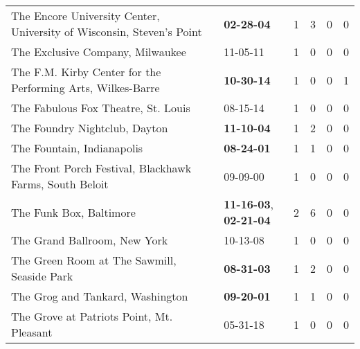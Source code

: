 \begin{longtable}{p{}p{}p{}p{}p{}p{}}
        The Encore University Center, University of Wisconsin, Steven’s Point &                                       \textbf{02-28-04\textsuperscript{}} &  1 &  3 &  0 &  0 \\
                                             The Exclusive Company, Milwaukee &                                                11-05-11\textsuperscript{} &  1 &  0 &  0 &  0 \\
                  The F.M. Kirby Center for the Performing Arts, Wilkes-Barre &                                       \textbf{10-30-14\textsuperscript{}} &  1 &  0 &  0 &  1 \\
                                          The Fabulous Fox Theatre, St. Louis &                                                08-15-14\textsuperscript{} &  1 &  0 &  0 &  0 \\
                                                The Foundry Nightclub, Dayton &                                       \textbf{11-10-04\textsuperscript{}} &  1 &  2 &  0 &  0 \\
                                                   The Fountain, Indianapolis &                                       \textbf{08-24-01\textsuperscript{}} &  1 &  1 &  0 &  0 \\
                      The Front Porch Festival, Blackhawk Farms, South Beloit &                                                09-09-00\textsuperscript{} &  1 &  0 &  0 &  0 \\
                                                      The Funk Box, Baltimore &  \textbf{11-16-03\textsuperscript{}}, \textbf{02-21-04\textsuperscript{}} &  2 &  6 &  0 &  0 \\
                                                 The Grand Ballroom, New York &                                                10-13-08\textsuperscript{} &  1 &  0 &  0 &  0 \\
                                  The Green Room at The Sawmill, Seaside Park &                                       \textbf{08-31-03\textsuperscript{}} &  1 &  2 &  0 &  0 \\
                                             The Grog and Tankard, Washington &                                       \textbf{09-20-01\textsuperscript{}} &  1 &  1 &  0 &  0 \\
                                    The Grove at Patriots Point, Mt. Pleasant &                                                05-31-18\textsuperscript{} &  1 &  0 &  0 &  0 \\

\end{longtable}
